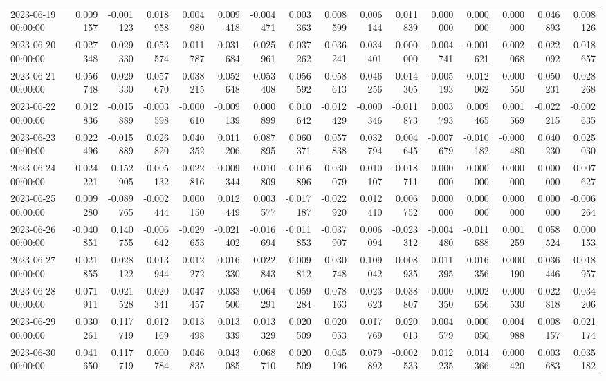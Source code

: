 \begin{tabular}{lrrrrrrrrrrrrrrr}
2023-06-19 00:00:00 & 0.009157 & -0.001123 & 0.018958 & 0.004980 & 0.009418 & -0.004471 & 0.003363 & 0.008599 & 0.006144 & 0.011839 & 0.000000 & 0.000000 & 0.000000 & 0.046893 & 0.008126 \\
2023-06-20 00:00:00 & 0.027348 & 0.029330 & 0.053574 & 0.011787 & 0.031684 & 0.025961 & 0.037262 & 0.036241 & 0.034401 & 0.000000 & -0.004741 & -0.001621 & 0.002068 & -0.022092 & 0.018657 \\
2023-06-21 00:00:00 & 0.056748 & 0.029330 & 0.057670 & 0.038215 & 0.052648 & 0.053408 & 0.056592 & 0.058613 & 0.046256 & 0.014305 & -0.005193 & -0.012062 & -0.000550 & -0.050231 & 0.028268 \\
2023-06-22 00:00:00 & 0.012836 & -0.015889 & -0.003598 & -0.000610 & -0.009139 & 0.000899 & 0.010642 & -0.012429 & -0.000346 & -0.011873 & 0.003793 & 0.009465 & 0.001569 & -0.022215 & -0.002635 \\
2023-06-23 00:00:00 & 0.022496 & -0.015889 & 0.026820 & 0.040352 & 0.011206 & 0.087895 & 0.060371 & 0.057838 & 0.032794 & 0.004645 & -0.007679 & -0.010182 & -0.000480 & 0.040230 & 0.025030 \\
2023-06-24 00:00:00 & -0.024221 & 0.152905 & -0.005132 & -0.022816 & -0.009344 & 0.010809 & -0.016896 & 0.030079 & 0.010107 & -0.018711 & 0.000000 & 0.000000 & 0.000000 & 0.000000 & 0.007627 \\
2023-06-25 00:00:00 & 0.009280 & -0.089765 & -0.002444 & 0.000150 & 0.012449 & 0.003577 & -0.017187 & -0.022920 & 0.012410 & 0.006752 & 0.000000 & 0.000000 & 0.000000 & 0.000000 & -0.006264 \\
2023-06-26 00:00:00 & -0.040851 & 0.140755 & -0.006642 & -0.029653 & -0.021402 & -0.016694 & -0.011853 & -0.037907 & 0.006094 & -0.023312 & -0.004480 & -0.011688 & 0.001259 & 0.058524 & 0.000153 \\
2023-06-27 00:00:00 & 0.021855 & 0.028122 & 0.013944 & 0.012272 & 0.016330 & 0.022843 & 0.009812 & 0.030748 & 0.109042 & 0.008935 & 0.011395 & 0.016356 & 0.000190 & -0.036446 & 0.018957 \\
2023-06-28 00:00:00 & -0.071911 & -0.021528 & -0.020341 & -0.047457 & -0.033500 & -0.064291 & -0.059284 & -0.078163 & -0.023623 & -0.038807 & -0.000350 & 0.002656 & 0.000530 & -0.022818 & -0.034206 \\
2023-06-29 00:00:00 & 0.030261 & 0.117719 & 0.012169 & 0.013498 & 0.013339 & 0.013329 & 0.020509 & 0.020053 & 0.017769 & 0.020013 & 0.004579 & 0.000050 & 0.004988 & 0.008157 & 0.021174 \\
2023-06-30 00:00:00 & 0.041650 & 0.117719 & 0.000784 & 0.046835 & 0.043085 & 0.068710 & 0.020509 & 0.045196 & 0.079892 & -0.002533 & 0.012235 & 0.014366 & 0.000420 & 0.003683 & 0.035182 \\

\end{tabular}
